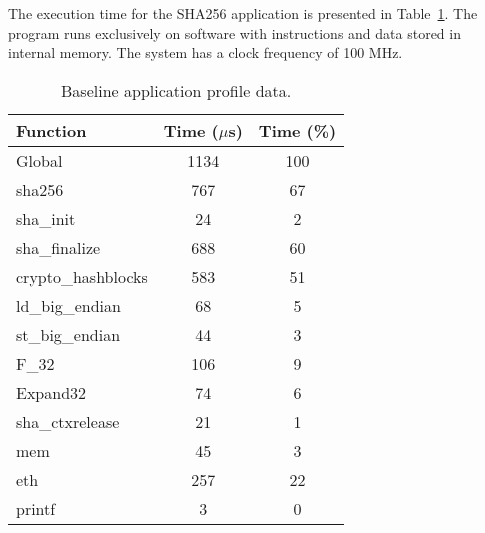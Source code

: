 The execution time for the SHA256 application is presented in
Table~\ref{tab:prof1}. The program runs exclusively on software with
instructions and data stored in internal memory. The system has a clock
frequency of 100 MHz.

\begin{table}[h]
    \centering
        \begin{tabular}{ | l | c | c | }
        \hline
        \rowcolor{iob-green}
        {\bf Function} & {\bf Time ($\mu$s)} & {\bf Time (\%)} \\ \hline
        \rowcolor{dark-blue}
        Global  &   1134    & 100 \\ \hline
        \rowcolor{dark-blue}
        sha256  &   767     & 67 \\ \hline
        \rowcolor{mid-blue}
            \hspace{10pt}sha\_init & 24  & 2 \\ \hline
        \rowcolor{mid-blue}
           \hspace{10pt}sha\_finalize & 688  & 60 \\ \hline
        \rowcolor{light-blue}
            \hspace{20pt}crypto\_hashblocks & 583  & 51 \\ \hline
            \hspace{30pt}ld\_big\_endian & 68  & 5 \\ \hline
            \hspace{30pt}st\_big\_endian & 44  & 3 \\ \hline
            \hspace{30pt}F\_32 & 106  & 9 \\ \hline
            \hspace{30pt}Expand32 & 74  & 6 \\ \hline
        \rowcolor{light-blue}
            \hspace{20pt}sha\_ctxrelease & 21  & 1 \\ \hline
        \rowcolor{dark-blue}
        mem     &   45      & 3 \\ \hline
        \rowcolor{dark-blue}
        eth     &   257     & 22 \\ \hline
        \rowcolor{dark-blue}
        printf  &   3       & 0  \\ \hline
        \end{tabular}
    \caption{Baseline application profile data.}
    \label{tab:prof1}
\end{table}
